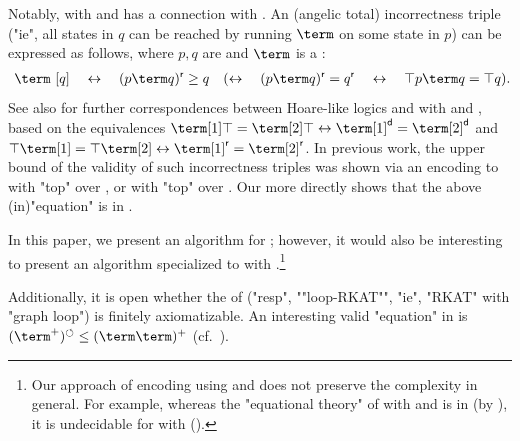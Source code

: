 \documentclass[10pt,a4paper]{article}
\theoremstyle{definition}
\theoremstyle{remark}
\newcommand{\dom}{\mathsf{d}}
\newcommand{\rng}{\mathsf{r}}
\newcommand{\lop}{\circlearrowleft}
\begin{document}
\begin{scope}
%
%
%

Notably,  with  and  has a connection with \intro*{} \cite{ohearnIncorrectnessLogic2019}.
%
An (angelic total) incorrectness triple ("ie", all states in $q$ can be reached by running $\term$ on some state in $p$)
can be expressed as follows, where $p, q$ are  and $\term$ is a :
\begin{gather*}
[p]~\term~[q] \quad\leftrightarrow\quad (p \term q)^{\rng} \ge q \quad(\leftrightarrow\quad (p \term q)^{\rng} = q^{\rng} \quad\leftrightarrow\quad \top p \term q = \top q).
\end{gather*}
See also \cite[Table 2]{verschtTaxonomyHoareLikeLogics2025} for further correspondences between Hoare-like logics and  with  and , based on the equivalences $\term[1] \top = \term[2] \top \leftrightarrow \term[1]^{\dom} = \term[2]^{\dom}$ and $\top \term[1] = \top \term[2] \leftrightarrow \term[1]^{\rng} = \term[2]^{\rng}$.
In previous work, the  upper bound of the validity of such incorrectness triples was shown via an encoding to  with "top" over  \cite{nakamuraExistentialCalculiRelations2023,pousCompletenessTheoremsKleene2024}, or  with "top" over  \cite{zhangDomainReasoningTopKAT2024}.
Our  more directly shows that the above (in)"equation" is in .

In this paper, we present an algorithm for ; however,
it would also be interesting to present an algorithm specialized to  with .\footnote{%
Our approach of encoding  using  and  does not preserve the complexity in general.
For example, whereas the "equational theory" of  with  and 
is in  (by \cite{lutzPDLNegationAtomic2005}), it is undecidable for  with  \cite{nakamuraExistentialCalculiRelations2023,nakamuraUndecidabilityEmptinessProblem2025} ().}

Additionally, it is open whether the  of  ("resp", ""loop-RKAT"", "ie",
"RKAT" with "graph loop") is finitely axiomatizable.
An interesting valid "equation" in  is $(\term^{+})^{\lop} \le (\term \term)^{+}$ (cf.~\cite[p.~14]{pousPositiveCalculusRelations2018}).

%
%
%


\end{scope}
\end{document}
